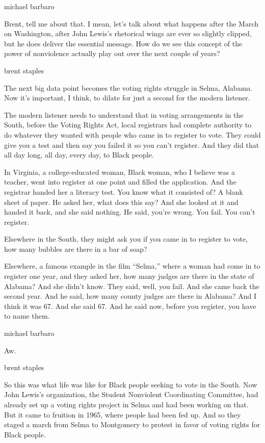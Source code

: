 michael barbaro

Brent, tell me about that. I mean, let's talk about what happens after
the March on Washington, after John Lewis's rhetorical wings are ever so
slightly clipped, but he does deliver the essential message. How do we
see this concept of the power of nonviolence actually play out over the
next couple of years?

brent staples

The next big data point becomes the voting rights struggle in Selma,
Alabama. Now it's important, I think, to dilate for just a second for
the modern listener.

The modern listener needs to understand that in voting arrangements in
the South, before the Voting Rights Act, local registrars had complete
authority to do whatever they wanted with people who came in to register
to vote. They could give you a test and then say you failed it so you
can't register. And they did that all day long, all day, every day, to
Black people.

In Virginia, a college-educated woman, Black woman, who I believe was a
teacher, went into register at one point and filled the application. And
the registrar handed her a literacy test. You know what it consisted of?
A blank sheet of paper. He asked her, what does this say? And she looked
at it and handed it back, and she said nothing. He said, you're wrong.
You fail. You can't register.

Elsewhere in the South, they might ask you if you came in to register to
vote, how many bubbles are there in a bar of soap?

Elsewhere, a famous example in the film ``Selma,'' where a woman had
come in to register one year, and they asked her, how many judges are
there in the state of Alabama? And she didn't know. They said, well, you
fail. And she came back the second year. And he said, how many county
judges are there in Alabama? And I think it was 67. And she said 67. And
he said now, before you register, you have to name them.

michael barbaro

Aw.

brent staples

So this was what life was like for Black people seeking to vote in the
South. Now John Lewis's organization, the Student Nonviolent
Coordinating Committee, had already set up a voting rights project in
Selma and had been working on that. But it came to fruition in 1965,
where people had been fed up. And so they staged a march from Selma to
Montgomery to protest in favor of voting rights for Black people.

